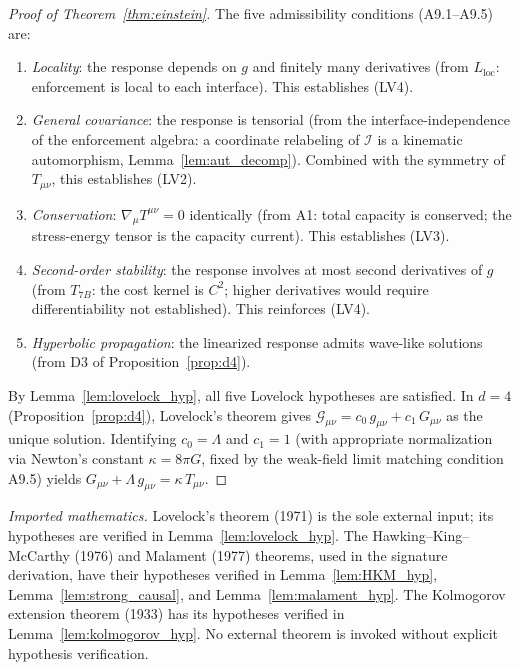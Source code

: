 \documentclass[11pt,a4paper]{article}
\theoremstyle{definition}
\begin{document}
\begin{proof}[Proof of Theorem~\ref{thm:einstein}]
The five admissibility conditions (A9.1--A9.5) are:
\begin{enumerate}[label=(A9.\arabic*),nosep]
  \item \textit{Locality}: the response depends on $g$ and finitely many
  derivatives (from $L_{\mathrm{loc}}$: enforcement is local to each
  interface).  This establishes (LV4).
  \item \textit{General covariance}: the response is tensorial (from
  the interface-independence of the enforcement algebra: a coordinate
  relabeling of $\mathcal{I}$ is a kinematic automorphism,
  Lemma~\ref{lem:aut_decomp}).  Combined with the symmetry of
  $T_{\mu\nu}$, this establishes (LV2).
  \item \textit{Conservation}: $\nabla_\mu T^{\mu\nu} = 0$ identically
  (from A1: total capacity is conserved; the stress-energy tensor is the
  capacity current).  This establishes (LV3).
  \item \textit{Second-order stability}: the response involves at most
  second derivatives of $g$ (from $T_{7B}$: the cost kernel is
  $C^2$; higher derivatives would require differentiability not
  established).  This reinforces (LV4).
  \item \textit{Hyperbolic propagation}: the linearized response admits
  wave-like solutions (from D3 of Proposition~\ref{prop:d4}).
\end{enumerate}
By Lemma~\ref{lem:lovelock_hyp}, all five Lovelock hypotheses are
satisfied.  In $d = 4$ (Proposition~\ref{prop:d4}), Lovelock's theorem
gives $\mathcal{G}_{\mu\nu} = c_0\, g_{\mu\nu} + c_1\, G_{\mu\nu}$
as the unique solution.  Identifying $c_0 = \Lambda$ and
$c_1 = 1$ (with appropriate normalization via Newton's constant
$\kappa = 8\pi G$, fixed by the weak-field limit matching condition
A9.5) yields $G_{\mu\nu} + \Lambda\, g_{\mu\nu} = \kappa\,
T_{\mu\nu}$.
\end{proof}

\smallskip\noindent\textit{Imported mathematics.}\quad
Lovelock's theorem (1971) is the sole external input; its hypotheses
are verified in Lemma~\ref{lem:lovelock_hyp}.  The Hawking--King--McCarthy
(1976) and Malament (1977) theorems, used in the signature
derivation, have their hypotheses verified in
Lemma~\ref{lem:HKM_hyp}, Lemma~\ref{lem:strong_causal}, and
Lemma~\ref{lem:malament_hyp}.  The Kolmogorov extension theorem (1933)
has its hypotheses verified in Lemma~\ref{lem:kolmogorov_hyp}.  No
external theorem is invoked without explicit hypothesis verification.
\end{document}
